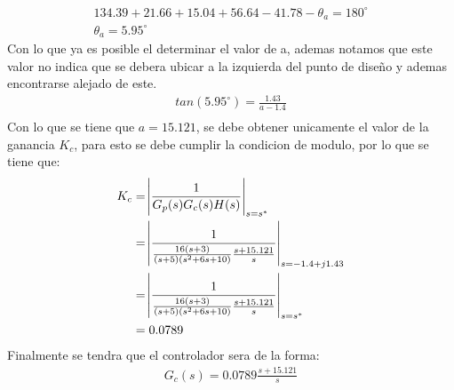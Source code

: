 \documentclass[
  11pt,
  letterpaper,
   addpoints,
   answers
  ]{exam}
\begin{document}
\begin{questions}
\begin{solution}
\begin{align}
    134.39 + 21.66 + 15.04 + 56.64 - 41.78 - \theta_{a} = 180^{\circ}\\
    \theta_{a}  = 5.95^{\circ} 
\end{align}
Con lo que ya es posible el determinar el valor de a, ademas notamos que este valor no indica que se debera ubicar a la izquierda del punto de diseño y ademas encontrarse alejado de este.
\begin{align}
    tan(5.95^{\circ}) = \frac{1.43}{a-1.4}\\
\end{align}
Con lo que se tiene que $a = 15.121$, se debe obtener unicamente el valor de la ganancia $K_{c}$, para esto se debe cumplir la condicion de modulo, por lo que se tiene que:
\begin{align}
    K_{c} &= \abs{\frac{1}{G_{p}(s)G_{c}(s)H(s)}}_{s=s^{*}}\\
          &= \abs{\frac{1}{\frac{16(s+3)}{(s+5)(s^{2}+6s+10)}\frac{s+15.121}{s}}}_{s=-1.4+j1.43}\\
          &= \abs{\frac{1}{\frac{16(s+3)}{(s+5)(s^{2}+6s+10)}\frac{s+15.121}{s}}}_{s=s^{*}}\\
          &= 0.0789
\end{align}
Finalmente se tendra que el controlador sera de la forma:
\begin{align}
    G_{c}(s) = 0.0789\frac{s+15.121}{s}
\end{align}

\end{solution}
\end{questions}
\end{document}
